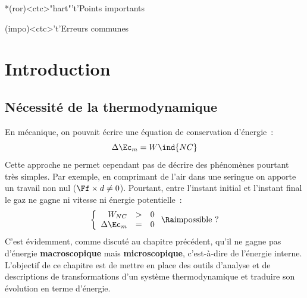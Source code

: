 \documentclass[../../main/main.tex]{subfiles}
\begin{document}
\begin{tcn}[sidebyside, fontupper=\small, fontlower=\small]
	\begin{tcn}*(ror)<ctc>"hart"'t'{Points importants}
	\end{tcn}
	\begin{tcn}(impo)<ctc>'t'{Erreurs communes}
	\end{tcn}
\end{tcn}

\vspace*{\fill}
\newpage

\section{Introduction}
\subsection{Nécessité de la thermodynamique}
En mécanique, on pouvait écrire une équation de conservation d'énergie~:
\[
	\Delta{\Ec_m} = W\ind{NC}
\]
Cette approche ne permet cependant pas de décrire des phénomènes pourtant très
simples. Par exemple, en comprimant de l'air dans une seringue on apporte un
travail non nul ($\Ff \times d \neq 0$). Pourtant, entre l'instant initial et
l'instant final le gaz ne gagne ni vitesse ni énergie potentielle~:
\[
	\left\{
	\begin{array}{rcl}
		W_{NC}        & > & 0
		\\
		\Delta{\Ec_m} & = & 0
	\end{array}
	\right.
	\Ra
	\text{impossible~?}
\]
C'est évidemment, comme discuté au chapitre précédent, qu'il ne gagne pas
d'énergie \textbf{macroscopique} mais \textbf{microscopique}, c'est-à-dire de
l'énergie interne.
\bigbreak
L'objectif de ce chapitre est de mettre en place des outils d'analyse et de
descriptions de transformations d'un système thermodynamique et traduire son
évolution en terme d'énergie.
\end{document}
